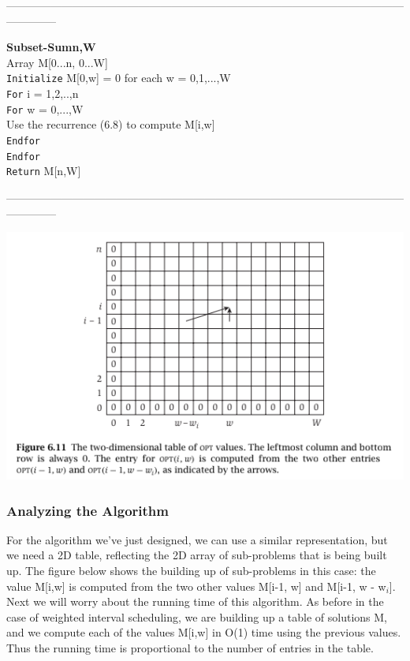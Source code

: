 \documentclass{article}
\begin{document}
\medskip
--------------------------------------------------------------------------------------------------------------------------
\medskip

\textbf{Subset-Sum{n,W}}\\
Array M[0...n, 0...W]\\
\texttt{Initialize} M[0,w] = 0 for each w = 0,1,...,W\\
\texttt{For} i = 1,2,..,n\\
\texttt{For} w = 0,...,W\\
Use the recurrence (6.8) to compute M[i,w]\\
\texttt{Endfor}\\
\texttt{Endfor}\\
\texttt{Return} M[n,W]

\medskip
--------------------------------------------------------------------------------------------------------------------------
\medskip

\begin{center}
    \includegraphics[]{figures/fig16.png}
\end{center}

\subsubsection{Analyzing the Algorithm}
For the algorithm we've just designed, we can use a similar representation, but we need a 2D table, reflecting the 2D array of sub-problems that is being built up. The figure below shows the building up of sub-problems in this case: the value M[i,w] is computed from the two other values M[i-1, w] and M[i-1, w - w$_i$]. Next we will worry about the running time of this algorithm. As before in the case of weighted interval scheduling, we are building up a table of solutions M, and we compute each of the values M[i,w] in O(1) time using the previous values. Thus the running time is proportional to the number of entries in the table.\\
\end{document}
